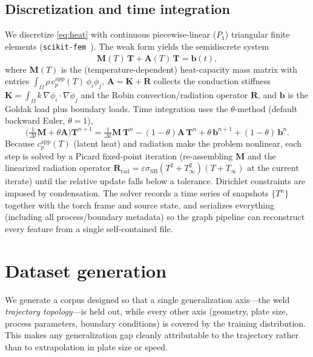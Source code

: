 \documentclass[11pt]{article}
\newcommand{\grad}{\nabla}
\newcommand{\cpapp}{c_p^{\mathrm{app}}}
\newcommand{\Tinf}{T_{\infty}}
\theoremstyle{definition}
\begin{document}
\subsection{Discretization and time integration}

We discretize \cref{eq:heat} with continuous piecewise-linear ($P_1$) triangular
finite elements (\texttt{scikit-fem}~\cite{skfem2020}). The weak form yields the
semidiscrete system
\begin{equation}
  \bm{M}(T)\,\dot{\bm T} + \bm{A}(T)\,\bm T = \bm b(t),
\end{equation}
where $\bm M(T)$ is the (temperature-dependent) heat-capacity mass matrix with
entries $\int_\Omega \rho\,\cpapp(T)\,\phi_i\phi_j$, $\bm A=\bm K+\bm R$ collects the
conduction stiffness $\bm K=\int_\Omega k\,\grad\phi_i\cdot\grad\phi_j$ and the Robin
convection/radiation operator $\bm R$, and $\bm b$ is the Goldak load plus boundary
loads. Time integration uses the $\theta$-method (default backward Euler,
$\theta=1$),
\begin{equation}
  \Big(\tfrac{1}{\Delta t}\bm M + \theta\bm A\Big)\bm T^{n+1}
  = \tfrac{1}{\Delta t}\bm M\,\bm T^{n}
  - (1-\theta)\bm A\,\bm T^{n}
  + \theta\,\bm b^{n+1}+(1-\theta)\,\bm b^{n}.
\end{equation}
Because $\cpapp(T)$ (latent heat) and radiation make the problem nonlinear, each step
is solved by a Picard fixed-point iteration (re-assembling $\bm M$ and the linearized
radiation operator $\bm R_{\mathrm{rad}}=\varepsilon\sigma_{\mathrm{SB}}
(T^2+\Tinf^2)(T+\Tinf)$ at the current iterate) until the relative update falls below a
tolerance. Dirichlet constraints are imposed by condensation. The solver records a
time series of snapshots $\{T^n\}$ together with the torch frame and source state, and
serializes everything (including all process/boundary metadata) so the graph pipeline
can reconstruct every feature from a single self-contained file.

\section{Dataset generation}
\label{sec:dataset}

We generate a corpus designed so that a single generalization axis---the weld
\emph{trajectory topology}---is held out, while every other axis (geometry, plate
size, process parameters, boundary conditions) is covered by the training
distribution. This makes any generalization gap cleanly attributable to the
trajectory rather than to extrapolation in plate size or speed.
\end{document}
